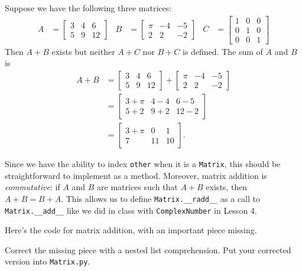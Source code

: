 \documentclass[m3380-lec-main.tex]{subfiles}
\begin{document}
\begin{exmp} Suppose we have the following three matrices:
\begin{align*} 
A &= \begin{bmatrix} 3 & 4 & 6 \\ 5 & 9 & 12 \end{bmatrix} &
B &= \begin{bmatrix} \pi & -4 & -5 \\ 2 & 2 & -2 \end{bmatrix} &
C &= \begin{bmatrix} 1 & 0 & 0 \\ 0 & 1 & 0 \\ 0 & 0 & 1 \end{bmatrix}
\end{align*}
Then $A+B$ exists but neither $A+C$ nor $B+C$ is defined. The sum of $A$ and $B$ is 
\begin{align*} A+B &= 
\begin{bmatrix} 3 & 4 & 6 \\ 5 & 9 & 12 \end{bmatrix} + 
\begin{bmatrix} \pi & -4 & -5 \\ 2 & 2 & -2 \end{bmatrix} \\
&= \begin{bmatrix} 3+\pi & 4-4 & 6-5 \\ 5+2 & 9+2 & 12-2\end{bmatrix} \\
&= \begin{bmatrix}3+\pi & 0 & 1 \\ 7 & 11 & 10\end{bmatrix}.
\end{align*}
\end{exmp}

Since we have the ability to index \verb|other| when it is a \verb|Matrix|, this should be straightforward to implement as a method. Moreover, matrix addition is \emph{commutative}: if $A$ and $B$ are matrices such that $A+B$ exists, then $A+B=B+A$. This allows us to define \verb|Matrix.__radd__| as a call to \verb|Matrix.__add__| like we did in class with \verb|ComplexNumber| in Lesson 4.

\begin{exc} Here's the code for matrix addition, with an important piece missing.

\smallskip\noindent
Correct the missing piece with a nested list comprehension. Put your corrected version into \verb|Matrix.py|.
\end{exc}
\end{document}
